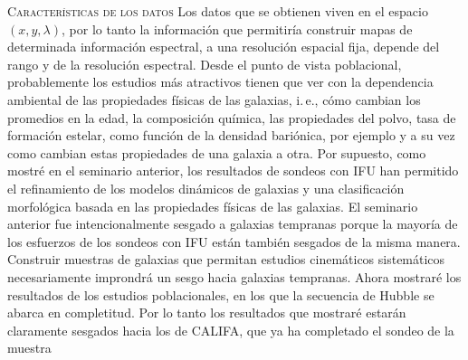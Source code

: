 \documentclass[xcolor=dvipsnames,4pt]{beamer}
\begin{document}
\begin{frame}[allowframebreaks]{\textsc{Características de los datos}}
%
Los datos que se obtienen viven en el espacio $(x,y,\lambda)$, por lo tanto la información que
permitiría construir mapas de determinada información espectral, a una resolución espacial fija,
depende del rango y de la resolución espectral. Desde el punto de vista poblacional, probablemente
los estudios más atractivos tienen que ver con la dependencia ambiental de las propiedades físicas
de las galaxias, i.\,e., cómo cambian los promedios en la edad, la composición química, las
propiedades del polvo, tasa de formación estelar, como función de la densidad bariónica, por ejemplo
y a su vez como cambian estas propiedades de una galaxia a otra.
%
Por supuesto, como mostré en el seminario anterior, los resultados de sondeos con IFU han permitido
el refinamiento de los modelos dinámicos de galaxias y una clasificación morfológica basada en las
propiedades físicas de las galaxias.
%
El seminario anterior fue intencionalmente sesgado a galaxias tempranas porque la mayoría de los
esfuerzos de los sondeos con IFU están también sesgados de la misma manera. Construir muestras de
galaxias que permitan estudios cinemáticos sistemáticos necesariamente improndrá un sesgo hacia
galaxias tempranas. Ahora mostraré los resultados de los estudios poblacionales, en los que la
secuencia de Hubble se abarca en completitud. Por lo tanto los resultados que mostraré estarán
claramente sesgados hacia los de CALIFA, que ya ha completado el sondeo de la muestra
%
%
\end{frame}
\end{document}
